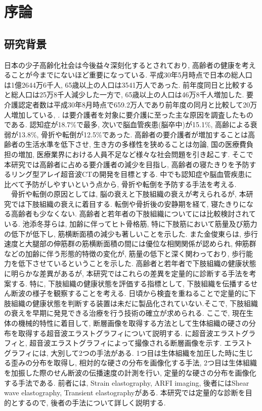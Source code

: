 \chapter{序論}
\newpage
\section{研究背景}
日本の少子高齢化社会は今後益々深刻化するとされており, 高齢者の健康を考えることが今までにないほど重要になっている. 平成30年5月時点で日本の総人口は1億2644万6千人, 65歳以上の人口は3541万人であった. 前年度同日と比較すると総人口は25万8千人減少した一方で, 65歳以上の人口は46万8千人増加した\cite{jinkou}. 要介護認定者数は平成30年8月時点で659.2万人であり前年度の同月と比較して20万人増加している\cite{youkaigo1}, \cite{youkaigo2}. は要介護者を対象に要介護に至った主な原因を調査したものである. 認知症が18.7\%で最多, 次いで脳血管疾患(脳卒中)が15.1\%, 高齢による衰弱が13.8\%, 骨折や転倒が12.5\%であった\cite{kaigogenin}. 高齢者の要介護者が増加することは高齢者の生活水準を低下させ, 生き方の多様性を狭めることは勿論, 国の医療費負担の増加, 医療業界における人員不足など様々な社会問題を引き起こす. そこで本研究では高齢者に占める要介護者の減少を目指し, 高齢者の寝たきりを予防するリング型アレイ超音波CTの開発を目標とする. 中でも認知症や脳血管疾患に比べて予防がしやすいという点から, 骨折や転倒を予防する手法を考える.
\\\ \ 骨折や転倒の原因としては, 脳の衰えと下肢組織の衰えが考えられるが, 本研究では下肢組織の衰えに着目する. 転倒や骨折後の安静期を経て, 寝たきりになる高齢者も少なくない. 高齢者と若年者の下肢組織についてには比較検討されている. 池添冬芽らは, 加齢に伴ってヒト骨格筋, 特に下肢筋において筋量及び筋力の低下が低下し, 筋横断面積の減少も著しいことを示した\cite{danmen}. また金俊東らは, 歩行速度と大腿部の伸筋群の筋横断面積の間には優位な相関関係が認められ, 伸筋群などの加齢に伴う形態的特徴の変化が, 筋量の低下と深く関わっており, 歩行能力を低下させているということを示した\cite{hokou}. 高齢者と若年者で下肢組織の健康状態に明らかな差異があるが, 本研究ではこれらの差異を定量的に診断する手法を考案する. 特に, 下肢組織の健康状態を評価する指標として, 下肢組織を伝播するせん断波の様子を観察することを考える. 日頃から検査を重ねることで定量的に下肢組織の健康状態を判断する装置は未だに製品化されていない.そこで, 下肢組織の衰えを早期に発見できる治療を行う技術の確立が求められる. ここで, 現在生体の機械的特性に着目して, 断層画像を取得する方法として生体組織の硬さの分布を取得する超音波エラストグラフィについて説明する.  に超音波エラストグラフィと, 超音波エラストグラフィによって撮像される断層画像を示す. エラストグラフィには, 大別して2つの手法がある. 1つ目は生体組織を加圧した時に生じる歪みの分布を取得し,  相対的な硬さの分布を画像化する手法, 2つ目は生体組織を加振した際のせん断波の伝播速度の計測を行い, 定量的な硬さの分布を画像化する手法である. 前者には, Strain elastography, ARFI imaging, 後者にはShear wave elastography, Transient elastographyがある. 本研究では定量的な診断を目的とするので, 後者の手法について詳しく説明する. 

